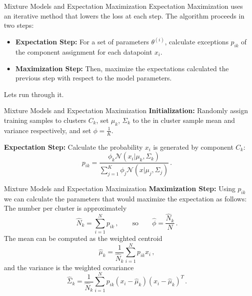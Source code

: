\documentclass[10pt, table, dvipsnames,xcdraw,handout]{beamer}
\begin{document}
\begin{frame}[fragile]{Mixture Models and Expectation Maximization}
 Expectation Maximization uses an iterative method that lowers the loss at each step. The algorithm proceeds in two steps:
\begin{itemize}
\item[] \textbf{Expectation Step:} For a set of parameters $\theta^{(i)}$, calculate exceptions $p_{ik}$ of the component assignment for each datapoint $x_i$.\pause 
\item[] \textbf{Maximization Step:} Then, maximize the expectations calculated the previous step with respect to the model parameters. \pause
\end{itemize}
Lets run through it.
\end{frame}


\begin{frame}[fragile]{Mixture Models and Expectation Maximization}
\textbf{Initialization:} Randomly assign training samples to clusters $C_k$, set $\mu_k$, $\Sigma_k$ to the in cluster sample mean and variance respectively, and set $\phi=\frac1K$. \pause

\textbf{Expectation Step:} Calculate the probability $x_i$ is generated by component $C_k$:
$$
p_{ik} = \frac{\phi_k \mathcal{N}(x_i | \mu_k,\Sigma_k) }{\sum_{j=1}^K \phi_j \mathcal{N}(x | \mu_j,\Sigma_j)}\,.
$$


\end{frame}





\begin{frame}[fragile]{Mixture Models and Expectation Maximization}
\textbf{Maximization Step:} Using $p_{ik}$ we can calculate the parameters that would maximize the expectation as follows: The number per cluster is approximately
$$
\hat{N}_k = \sum_{i=1}^N p_{ik}\,,\hspace{2em}\text{so}\hspace{2em} \hat \phi = \frac{\hat N_k}{N}\,.
$$\pause
The mean can be computed as the weighted centroid
$$
\hat\mu_k = \frac{1}{\hat N_k}\sum_{i=1}^N p_{ik}x_i\,,
$$\pause
and the variance is the weighted covariance
$$
\hat\Sigma_k = \frac{1}{\hat N_k}\sum_{i=1}^N p_{ik}(x_i-\hat \mu _k)(x_i-\hat \mu _k)^T\,.
$$
\end{frame}
\end{document}
